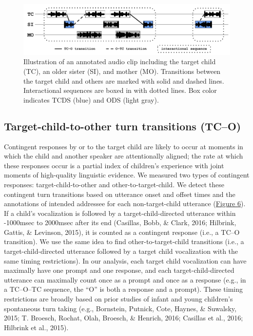 \documentclass[floatsintext,man]{apa6}
\theoremstyle{definition}
\theoremstyle{definition}
\theoremstyle{definition}
\theoremstyle{remark}
\begin{document}
\begin{figure}

{\centering \includegraphics[width=1\linewidth]{Tseltal-CLE_files/TseltalCLE-TurnTimingIllustration} 

}

\caption{Illustration of an annotated audio clip including the target child (TC), an older sister (SI), and mother (MO). Transitions between the target child and others are marked with solid and dashed lines. Interactional sequences are boxed in with dotted lines. Box color indicates TCDS (blue) and ODS (light gray).}\label{fig:fig6}
\end{figure}

\subsection{Target-child-to-other turn transitions
(TC--O)}\label{target-child-to-other-turn-transitions-tco}

Contingent responses by or to the target child are likely to occur at
moments in which the child and another speaker are attentionally
aligned; the rate at which these responses occur is a partial index of
children's experience with joint moments of high-quality linguistic
evidence. We measured two types of contingent responses:
target-child-to-other and other-to-target-child. We detect these
contingent turn transitions based on utterance onset and offset times
and the annotations of intended addressee for each non-target-child
utterance (\protect\hyperlink{fig6}{Figure 6}). If a child's
vocalization is followed by a target-child-directed utterance within
-1000msec to 2000msec after its end (Casillas, Bobb, \& Clark, 2016;
Hilbrink, Gattis, \& Levinson, 2015), it is counted as a contingent
response (i.e., a TC--O transition). We use the same idea to find
other-to-target-child transitions (i.e., a target-child-directed
utterance followed by a target child vocalization with the same timing
restrictions). In our analysis, each target child vocalization can have
maximally have one prompt and one response, and each
target-child-directed utterance can maximally count once as a prompt and
once as a response (e.g., in a TC--O--TC sequence, the \enquote{O} is
both a response and a prompt). These timing restrictions are broadly
based on prior studies of infant and young children's spontaneous turn
taking (e.g., Bornstein, Putnick, Cote, Haynes, \& Suwalsky, 2015; T.
Broesch, Rochat, Olah, Broesch, \& Henrich, 2016; Casillas et al., 2016;
Hilbrink et al., 2015).
\end{document}
